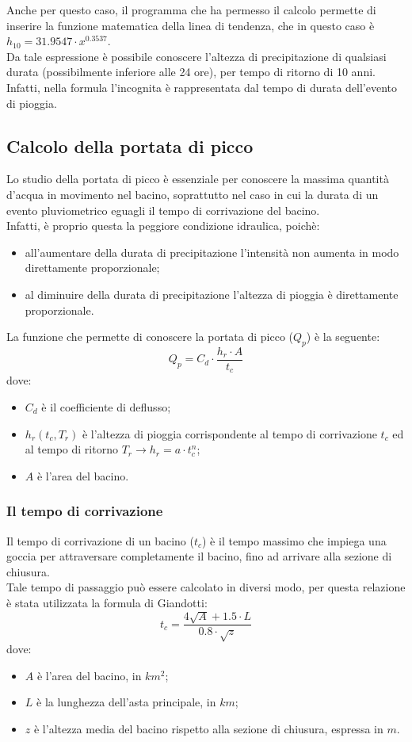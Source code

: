 Anche per questo caso, il programma che ha permesso il calcolo permette di inserire la funzione matematica della linea di tendenza, che in questo caso è $h_{10}= 31.9547 \cdot x^{0.3537}$. \\
Da tale espressione è possibile conoscere l'altezza di precipitazione di qualsiasi durata (possibilmente inferiore alle 24 ore), per tempo di ritorno di 10 anni. Infatti, nella formula l'incognita è rappresentata dal tempo di durata dell'evento di pioggia.

\subsection{Calcolo della portata di picco}
Lo studio della portata di picco è essenziale per conoscere la massima quantità d'acqua in movimento nel bacino, soprattutto nel caso in cui la durata di un evento pluviometrico eguagli il tempo di corrivazione del bacino.\\
Infatti, è proprio questa la peggiore condizione idraulica, poichè:
\begin{itemize}
    \item all'aumentare della durata di precipitazione l'intensità non aumenta in modo direttamente proporzionale;
    \item al diminuire della durata di precipitazione l'altezza di pioggia è direttamente proporzionale.
\end{itemize}
La funzione che permette di conoscere la portata di picco ($Q_p$) è la seguente:
\begin{equation}
    Q_p = C_d \cdot \frac{h_r \cdot A}{t_c}
    \label{Qp}
\end{equation}
dove: 
\begin{itemize}
    \item $C_d$ è il coefficiente di deflusso;
    \item $h_r(t_c, T_r)$ è l'altezza di pioggia corrispondente al tempo di corrivazione $t_c$ ed al tempo di ritorno $T_r \rightarrow h_r = a \cdot t_c ^n$;
    \item $A$ è l'area del bacino.
\end{itemize}
\subsubsection*{Il tempo di corrivazione}
Il tempo di corrivazione di un bacino ($t_c$) è il tempo massimo che impiega una goccia per attraversare completamente il bacino, fino ad arrivare alla sezione di chiusura.\\
Tale tempo di passaggio può essere calcolato in diversi modo, per questa relazione è stata utilizzata la formula di Giandotti:
\begin{equation}
    t_c = \frac{4 \sqrt{A} + 1.5 \cdot L}{0.8 \cdot \sqrt{z}}
    \label{giandotti}
\end{equation}
dove: 
\begin{itemize}
    \item $A$ è l'area del bacino, in $km^2$;
    \item $L$ è la lunghezza dell'asta principale, in $km$;
    \item $z$ è l'altezza media del bacino rispetto alla sezione di chiusura, espressa in $m$.
\end{itemize}
